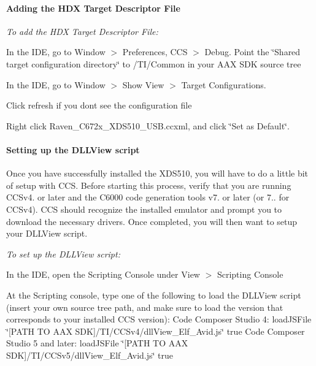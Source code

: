 \hypertarget{a00832_subsubsection__adding_the_hdx_target_descriptor_file_}{}\paragraph{Adding the H\+D\+X Target Descriptor File}\label{a00832_subsubsection__adding_the_hdx_target_descriptor_file_}
 {\itshape  To add the H\+DX Target Descriptor File\+:} 
\begin{DoxyEnumerate}
\item In the I\+DE, go to Window $>$ Preferences, C\+CS $>$ Debug. Point the \char`\"{}\+Shared target configuration directory\char`\"{} to /\+T\+I/\+Common in your A\+AX S\+DK source tree  
\item In the I\+DE, go to Window $>$ Show View $>$ Target Configurations.  
\item Click refresh if you don\textquotesingle{}t see the configuration file  
\item Right click Raven\+\_\+\+C672x\+\_\+\+X\+D\+S510\+\_\+\+U\+S\+B.\+ccxml, and click \char`\"{}\+Set as Default\char`\"{}.  
\end{DoxyEnumerate}

\hypertarget{a00832_subsubsection__setting_up_the_dllview_script_}{}\paragraph{Setting up the D\+L\+L\+View script}\label{a00832_subsubsection__setting_up_the_dllview_script_}
 Once you have successfully installed the X\+D\+S510, you will have to do a little bit of setup with C\+CS. Before starting this process, verify that you are running C\+C\+Sv4. or later and the C6000 code generation tools v7. or later (or 7.. for C\+C\+Sv4). C\+CS should recognize the installed emulator and prompt you to download the necessary drivers. Once completed, you will then want to setup your D\+L\+L\+View script.

{\itshape  To set up the D\+L\+L\+View script\+:} 
\begin{DoxyEnumerate}
\item In the I\+DE, open the Scripting Console under View $>$ Scripting Console  
\item At the Scripting console, type one of the following to load the D\+L\+L\+View script (insert your own source tree path, and make sure to load the version that corresponds to your installed C\+CS version)\+:  Code Composer Studio 4\+: {\ttfamily load\+J\+S\+File \char`\"{}\mbox{[}\+P\+A\+T\+H T\+O A\+A\+X S\+D\+K\mbox{]}/\+T\+I/\+C\+C\+Sv4/dll\+View\+\_\+\+Elf\+\_\+\+Avid.\+js\char`\"{} true } Code Composer Studio 5 and later\+: {\ttfamily load\+J\+S\+File \char`\"{}\mbox{[}\+P\+A\+T\+H T\+O A\+A\+X S\+D\+K\mbox{]}/\+T\+I/\+C\+C\+Sv5/dll\+View\+\_\+\+Elf\+\_\+\+Avid.\+js\char`\"{} true }  
\end{DoxyEnumerate}

